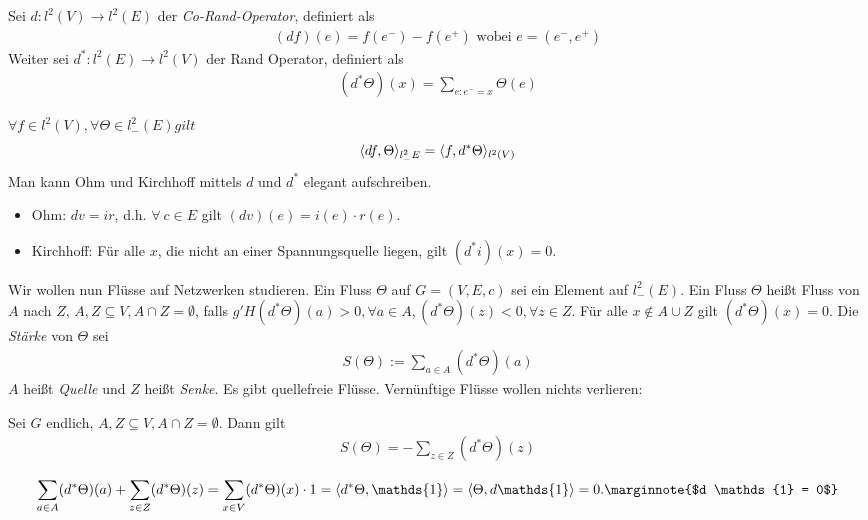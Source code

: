 \begin{definition}
	Sei $d:l^2(V) \to l^2(E)$ der \emph{Co-Rand-Operator}, definiert als
	\begin{gather}
	(df)(e) =  f(e^-) - f(e^+) \text{ wobei } e= (e^-,e^+)
	\end{gather}
	Weiter sei $d^*: l^2(E) \to l^2(V)$ der Rand Operator, definiert als
	\begin{gather}
	(d^*\Theta)(x) = \sum\limits_{e:e^-=x} \Theta(e)
	\end{gather}
\end{definition}
\begin{uebung}
	$\forall f \in l^2(V), \forall \Theta \in l^2_-(E)gilt$
	\begin{gather}
	\langle df,\Theta\rangle_{l^2_-E} = \langle f,d^*\Theta\rangle_{l^2(V)}
	\end{gather}
	Man kann Ohm und Kirchhoff mittels $d$ und $d^*$ elegant aufschreiben.
	\begin{itemize}
		\item Ohm: $dv = ir$, d.h. $\forall \ c \in E$ gilt $(dv)(e) = i(e) \cdot r(e)$.
		\item Kirchhoff: Für alle $x$, die nicht an einer Spannungsquelle liegen, gilt $(d^*i)(x)= 0$.
	\end{itemize}
\end{uebung}
Wir wollen nun Flüsse auf Netzwerken studieren. Ein Fluss $\Theta$ auf $G = (V,E,c)$ sei ein Element auf $l^2_-(E)$. Ein Fluss $\Theta$ heißt Fluss von $A$ nach $Z$, $A,Z \subseteq V, A \cap Z = \emptyset$, falls $g'H (d^*\Theta)(a) > 0, \forall a\in A , (d^*\Theta)(z)<0, \forall z \in Z$. Für alle $x \notin A\cup Z$ gilt $(d^*\Theta)(x) = 0$. Die \emph{Stärke} von $\Theta$ sei 
\begin{gather}
S(\Theta) :=\sum\limits_{a \in A}(d^*\Theta)(a)
\end{gather}
$A$ heißt \emph{Quelle} und $Z$ heißt \emph{Senke}. Es gibt quellefreie  Flüsse. Vernünftige Flüsse wollen nichts verlieren:
\begin{lemma}
	Sei $G$ endlich, $A,Z \subseteq V, A \cap Z = \emptyset$. Dann gilt 
	\begin{align}
	S(\Theta) = -\sum\limits_{z \in Z}(d^*\Theta)(z)
	\end{align}
\end{lemma}
\begin{beweis}
	\begin{gather}
	\sum\limits_{a \in A} (d^*\Theta)(a) + \sum\limits_{z \in Z} (d^*\Theta)(z) = \sum\limits_{x \in V}(d^*\Theta)(x) \cdot 1 = \sprod{d^*\Theta,\mathds{1}} = \sprod{\Theta,d \mathds{1}} = 0. \marginnote{$d \mathds{1} = 0$}
	\end{gather}
\end{beweis}

